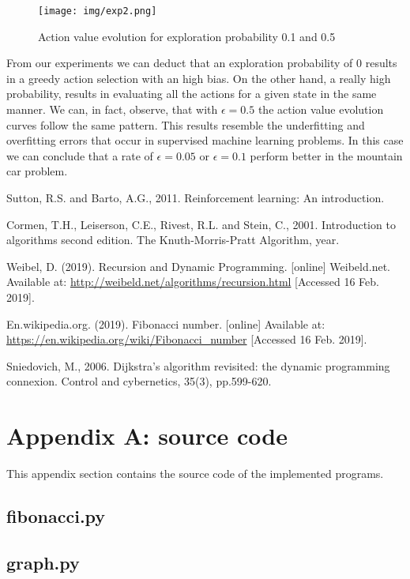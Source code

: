 \documentclass[runningheads]{llncs}
\begin{document}
\begin{figure}
\texttt{[image: img/exp2.png]}
\caption{Action value evolution for exploration probability 0.1 and 0.5} \label{exp2}
\end{figure}
From our experiments we can deduct that an exploration probability of
$0$ results in a greedy action selection with an high bias. On the
other hand, a really high probability, results in evaluating all the
actions for a given state in the same manner. We can, in fact,
observe, that with $\epsilon = 0.5$ the action value evolution curves
follow the same pattern. This results resemble the underfitting and
overfitting errors that occur in supervised machine learning
problems. In this case we can conclude that a rate of $\epsilon =
0.05$ or $\epsilon = 0.1$ perform better in the mountain car problem.

\begin{thebibliography}{8}

Sutton, R.S. and Barto, A.G., 2011. Reinforcement learning: An introduction.

Cormen, T.H., Leiserson, C.E., Rivest, R.L. and Stein, C., 2001. Introduction to algorithms second edition. The Knuth-Morris-Pratt Algorithm, year.

Weibel, D. (2019). Recursion and Dynamic Programming. [online] Weibeld.net. Available at: \url{http://weibeld.net/algorithms/recursion.html} [Accessed 16 Feb. 2019].

En.wikipedia.org. (2019). Fibonacci number. [online] Available at: \url{https://en.wikipedia.org/wiki/Fibonacci\_number} [Accessed 16 Feb. 2019].

Sniedovich, M., 2006. Dijkstra's algorithm revisited: the dynamic programming connexion. Control and cybernetics, 35(3), pp.599-620.

\end{thebibliography}


\section{Appendix A: source code}\label{appendix}
This appendix section contains the source code of the implemented programs.

\subsection{fibonacci.py}\label{fibonacci_code}


\subsection{graph.py}\label{graph_code}

\end{document}
